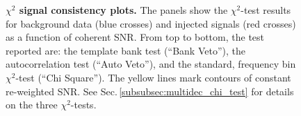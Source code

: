 \documentclass[binding=0.6cm, LaM]{sapthesis}
\begin{document}
        \begin{figure}[!t]
          \noindent
          \label{signalconsistencyplots1}
          \centering
          \caption{\textbf{$\chi^2$ signal consistency plots.} The panels show the $\chi^2$-test results for background data (blue crosses) and injected signals (red crosses) as a function of coherent SNR.   From top to bottom, the test reported are: the template bank test (``Bank Veto''), the autocorrelation test (``Auto Veto''), and the standard, frequency bin $\chi^2$-test (``Chi Square'').   The yellow lines mark contours of constant re-weighted SNR. See Sec.\,\ref{subsubsec:multidec_chi_test} for details on the three $\chi^2$-tests.}
          \label{fig:signalconsistencyplots1}
       	\end{figure}
\end{document}
